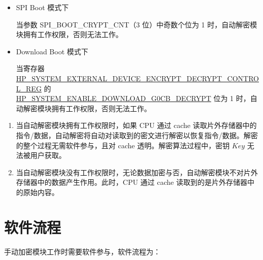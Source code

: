 \documentclass[main\_\_CN.tex]{subfiles}
\begin{document}
\begin{itemize}
    
    \item SPI Boot 模式下
    
    当参数 SPI\_BOOT\_CRYPT\_CNT（3 位）中奇数个位为 1 时，自动解密模块拥有工作权限，否则无法工作。
    
    \item Download Boot 模式下
    
    当寄存器 \hyperref[regdesc:HPSYSTEMEXTERNALDEVICEENCRYPTDECRYPTCONTROLREG]{HP\_SYSTEM\_EXTERNAL\_DEVICE\_ENCRYPT\_DECRYPT\_CONTROL\_REG} 的 \\ \hyperref[fielddesc:HPSYSTEMENABLEDOWNLOADG0CBDECRYPT]{HP\_SYSTEM\_ENABLE\_DOWNLOAD\_G0CB\_DECRYPT} 位为 1 时，自动解密模块拥有工作权限，否则无法工作。
    
\end{itemize}


\begin{tiplisting}
\vspace{-2em}
\begin{enumerate}

\item 当自动解密模块拥有工作权限时，如果 CPU 通过 cache 读取片外存储器中的指令/数据，自动解密将自动对读取到的密文进行解密以恢复指令/数据。解密的整个过程无需软件参与，且对 cache 透明。解密算法过程中，密钥 \begin{math}\mathit{Key}\end{math} 无法被用户获取。

\item 当自动解密模块没有工作权限时，无论数据加密与否，自动解密模块不对片外存储器中的数据产生作用。此时，CPU 通过 cache 读取到的是片外存储器中的原始内容。

\end{enumerate}
\end{tiplisting}


\section{ 软件流程 }
手动加密模块工作时需要软件参与，软件流程为：
\end{document}
